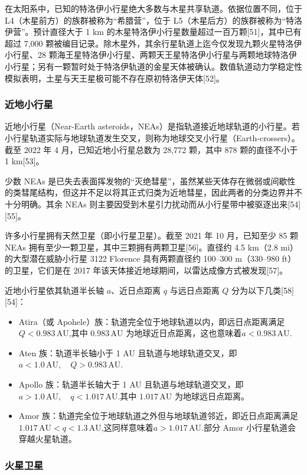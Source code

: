 在太阳系中，已知的特洛伊小行星绝大多数与木星共享轨道。依据位置不同，位于 L4（木星前方）的族群被称为“希腊营”，位于 L5（木星后方）的族群被称为“特洛伊营”。预计直径大于 1 km 的木星特洛伊小行星数量超过一百万颗[51]，其中已有超过 7{,}000 颗被编目记录。除木星外，其余行星轨道上迄今仅发现九颗火星特洛伊小行星、28 颗海王星特洛伊小行星、两颗天王星特洛伊小行星与两颗地球特洛伊小行星；另有一颗暂时处于特洛伊轨道的金星天体被确认。数值轨道动力学稳定性模拟表明，土星与天王星极可能不存在原初特洛伊天体[52]。
\subsubsection{近地小行星}
近地小行星（Near-Earth asteroids，NEAs）是指轨道接近地球轨道的小行星。若小行星轨道实际与地球轨道发生交叉，则称为地球交叉小行星（Earth-crossers）。截至 2022 年 4 月，已知近地小行星总数为 28{,}772 颗，其中 878 颗的直径不小于 1 km[53]。

少数 NEAs 是已失去表面挥发物的“灭绝彗星”，虽然某些天体存在微弱或间歇性的类彗尾结构，但这并不足以将其正式归类为近地彗星，因此两者的分类边界并不十分明确。其余 NEAs 则主要因受到木星引力扰动而从小行星带中被驱逐出来[54][55]。

许多小行星拥有天然卫星（即小行星卫星）。截至 2021 年 10 月，已知至少 85 颗 NEAs 拥有至少一颗卫星，其中三颗拥有两颗卫星[56]。直径约 4.5 km（2.8 mi）的大型潜在威胁小行星 3122 Florence 具有两颗直径约 100–300 m（330–980 ft）的卫星，它们是在 2017 年该天体接近地球期间，以雷达成像方式被发现[57]。

近地小行星依其轨道半长轴 \(a\)、近日点距离 \(q\) 与远日点距离 \(Q\) 分为以下几类[58][54]：
\begin{itemize}
\item Atira（或 Apohele）族：轨道完全位于地球轨道以内，即远日点距离满足\( Q < 0.983\,\mathrm{AU}\),其中 \(0.983\,\mathrm{AU}\) 为地球近日点距离，这也意味着\(a < 0.983\,\mathrm{AU}\).
\item Aten 族：轨道半长轴小于 1 AU 且轨道与地球轨道交叉，即\(a < 1.0\,\mathrm{AU},\quad Q > 0.983\,\mathrm{AU}\).
\item Apollo 族：轨道半长轴大于 1 AU 且轨道与地球轨道交叉，即\(a > 1.0\,\mathrm{AU},\quad q < 1.017\,\mathrm{AU}\).其中 \(1.017\,\mathrm{AU}\) 为地球远日点距离。
\item Amor 族：轨道完全位于地球轨道之外但与地球轨道邻近，即近日点距离满足\(1.017\,\mathrm{AU} < q < 1.3\,\mathrm{AU}\),这同样意味着\(a > 1.017\,\mathrm{AU}\).部分 Amor 小行星轨道会穿越火星轨道。
\end{itemize}
\subsubsection{火星卫星}



